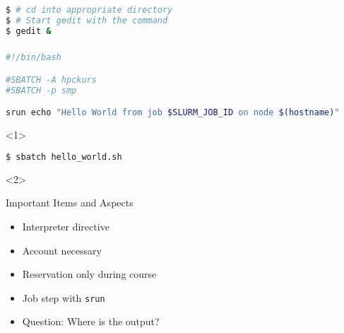 \setcounter{preframe_handson}{\value{handson}}

\begin{frame}[fragile]
  \setcounter{handson}{\value{preframe_handson}}
  \frametitle{}
  \begin{lstlisting}[language=Bash, style=Shell, basicstyle=\scriptsize]
$ # cd into appropriate directory
$ # Start gedit with the command 
$ gedit &
  \end{lstlisting}
\end{frame}

\begin{frame}[fragile]
  \setcounter{handson}{\value{preframe_handson}}
  \frametitle{}
  \vspace{-2em}
  \begin{minipage}[t][0.32\textheight][t]{1.0\linewidth}
  \begin{lstlisting}[language=Bash, style=Shell, basicstyle=\scriptsize]
#!/bin/bash

#SBATCH -A hpckurs
#SBATCH -p smp

srun echo "Hello World from job $SLURM_JOB_ID on node $(hostname)"
\end{lstlisting}
\end{minipage}\newline
\begin{minipage}[t][0.3\textheight][t]{1.0\linewidth}
  \begin{onlyenv}<1>
    \begin{lstlisting}[language=Bash, style=Shell, basicstyle=\footnotesize]
$ sbatch hello_world.sh
\end{lstlisting}
\end{onlyenv}
\begin{onlyenv}<2>
\begin{block}{Important Items and Aspects}
  \begin{itemize}
  \item Interpreter directive
  \item Account necessary
  \item Reservation only during course
  \item Job step with \texttt{srun}
  \item Question: Where is the output?
  \end{itemize}
\end{block}
\end{onlyenv}
\end{minipage}
\vfill
\end{frame}

